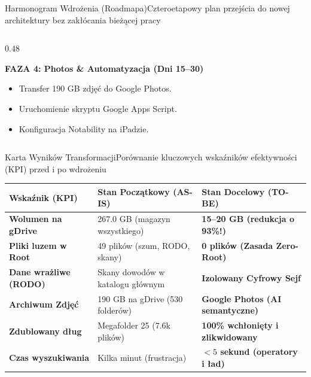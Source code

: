 \documentclass[aspectratio=169, 10pt]{beamer}
\begin{document}
\begin{frame}{Harmonogram Wdrożenia (Roadmapa)}{Czteroetapowy plan przejścia do nowej architektury bez zakłócania bieżącej pracy}
\begin{columns}[T]
\begin{column}{0.48\textwidth}
      \vspace{0.2cm}
      \begin{exampleblock}{\textbf{FAZA 4: Photos \& Automatyzacja (Dni 15--30)}}
        \footnotesize
        \begin{itemize}
          \item Transfer 190 GB zdjęć do Google Photos.
          \item Uruchomienie skryptu Google Apps Script.
          \item Konfiguracja Notability na iPadzie.
        \end{itemize}
      \end{exampleblock}
    \end{column}
  \end{columns}
\end{frame}

\begin{frame}{Karta Wyników Transformacji}{Porównanie kluczowych wskaźników efektywności (KPI) przed i po wdrożeniu}
  \begin{center}
    \small
    \begin{tabularx}{\textwidth}{p{3.5cm}p{4cm}X}
      \toprule
      \textbf{Wskaźnik (KPI)} & \textbf{Stan Początkowy (AS-IS)} & \textbf{Stan Docelowy (TO-BE)} \\
      \midrule
      \textbf{Wolumen na gDrive} & 267.0 GB (magazyn wszystkiego) & \textbf{15--20 GB (redukcja o 93\%!)} \\
      \addlinespace
      \textbf{Pliki luzem w Root} & 49 plików (szum, RODO, skany) & \textbf{0 plików (Zasada Zero-Root)} \\
      \addlinespace
      \textbf{Dane wrażliwe (RODO)} & Skany dowodów w katalogu głównym & \textbf{Izolowany Cyfrowy Sejf} \\
      \addlinespace
      \textbf{Archiwum Zdjęć} & 190 GB na gDrive (530 folderów) & \textbf{Google Photos (AI semantyczne)} \\
      \addlinespace
      \textbf{Zdublowany dług} & Megafolder 25 (7.6k plików) & \textbf{100\% wchłonięty i zlikwidowany} \\
      \addlinespace
      \textbf{Czas wyszukiwania} & Kilka minut (frustracja) & \textbf{$<5$ sekund (operatory i ład)} \\
      \bottomrule
    \end{tabularx}
  \end{center}
\end{frame}
\end{document}

